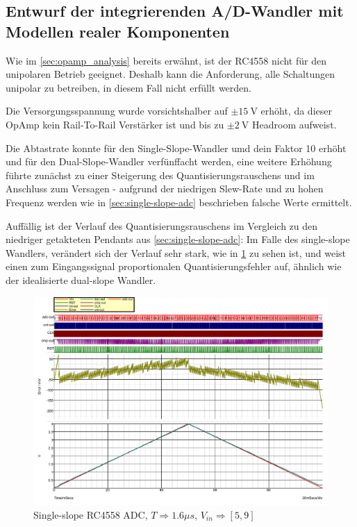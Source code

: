 \documentclass[
	ngerman,
	parskip=half,
	twocolumn,
	DIV=calc,
	]{scrartcl}
\begin{document}
		\subsection{Entwurf der integrierenden A/D-Wandler mit Modellen realer Komponenten}		
		
		Wie im \cref{sec:opamp_analysis} bereits erwähnt, ist der RC4558 nicht für den unipolaren Betrieb geeignet. Deshalb kann die Anforderung, alle Schaltungen unipolar zu betreiben, in diesem Fall nicht erfüllt werden. 
		
		Die Versorgungsspannung wurde vorsichtshalber auf $\pm \SI{15}{\volt} $ erhöht, da dieser OpAmp kein Rail-To-Rail Verstärker ist und bis zu $\pm \SI{2}{\volt} $ Headroom aufweist. 
		
		Die Abtastrate konnte für den Single-Slope-Wandler umd dein Faktor 10 erhöht und für den Dual-Slope-Wandler verfünffacht werden, eine weitere Erhöhung führte zunächst zu einer Steigerung des Quantisierungsrauschens und im Anschluss zum Versagen - aufgrund der niedrigen Slew-Rate und zu hohen Frequenz werden wie in \cref{sec:single-slope-adc} beschrieben falsche Werte ermittelt. 
		
		Auffällig ist der Verlauf des Quantisierungsrauschens im Vergleich zu den niedriger getakteten Pendants aus \cref{sec:single-slope-adc}: Im Falle des single-slope Wandlers, verändert sich der Verlauf sehr stark, wie in \cref{fig:single-slope-RC4558} zu sehen ist, und weist einen zum Eingangssignal proportionalen Quantisierungsfehler auf, ähnlich wie der idealisierte dual-slope Wandler.				
				
		\begin{figure}
			\centering
			\includegraphics[width=\linewidth]{RC4558_single_slope}
			\caption[Single-slope RC4558 ADC]{Single-slope RC4558 ADC, $T \Rightarrow 1.6\mu s$, $V_{in} \Rightarrow [5,  9]$}
			\label{fig:single-slope-RC4558}
		\end{figure}	
	
\end{document}
